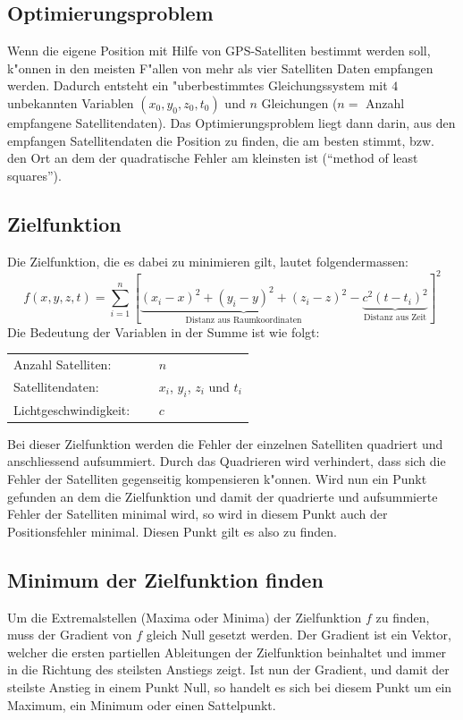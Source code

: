 \begin{refsection}
\section{Optimierungsproblem}
Wenn die eigene Position mit Hilfe von GPS-Satelliten bestimmt werden
soll, k"onnen in den meisten F"allen von mehr als vier Satelliten Daten
empfangen werden. Dadurch entsteht ein "uberbestimmtes Gleichungssystem
mit $4$ unbekannten Variablen $(x_0,y_0,z_0,t_0)$ und $n$ Gleichungen
($n = $ Anzahl empfangene Satellitendaten). Das Optimierungsproblem liegt
dann darin, aus den empfangen Satellitendaten die Position zu finden,
die am besten stimmt, bzw. den Ort an dem der quadratische Fehler am
kleinsten ist (``method of least squares'').

\subsection{Zielfunktion}
Die Zielfunktion, die es dabei zu minimieren gilt, lautet folgendermassen:
\[
f(x,y,z,t)
=
\sum_{i=1}^{n}\left[
\underbrace{(x_i-x)^2 + (y_i-y)^2 + (z_i-z)^2}_{\text{Distanz aus Raumkoordinaten}}
-
\underbrace{c^2 (t-t_i)^2}_{\text{Distanz aus Zeit}}\right]^2
\]
Die Bedeutung der Variablen in der Summe ist wie folgt:
\begin{center}
\begin{tabular}{ll}
Anzahl Satelliten: $\quad$& $n$\\
Satellitendaten: $\quad$& $x_i$, $y_i$, $z_i$ und $t_i$\\
Lichtgeschwindigkeit: $\quad$& $c$\\
\end{tabular}
\end{center}
Bei dieser Zielfunktion werden die Fehler der einzelnen Satelliten
quadriert und anschliessend aufsummiert. Durch das Quadrieren wird
verhindert, dass sich die Fehler der Satelliten gegenseitig kompensieren
k"onnen. Wird nun ein Punkt gefunden an dem die Zielfunktion und damit
der quadrierte und aufsummierte Fehler der Satelliten minimal wird,
so wird in diesem Punkt auch der Positionsfehler minimal. Diesen Punkt
gilt es also zu finden.

\subsection{Minimum der Zielfunktion finden}\label{Minimum der ZF}
Um die Extremalstellen (Maxima oder Minima) der Zielfunktion $f$
zu finden, muss der Gradient von $f$ gleich Null gesetzt werden. Der
Gradient ist ein Vektor, welcher die ersten partiellen Ableitungen
der Zielfunktion beinhaltet und immer in die Richtung des steilsten
Anstiegs zeigt. Ist nun der Gradient, und damit der steilste Anstieg in
einem Punkt Null, so handelt es sich bei diesem Punkt um ein Maximum,
ein Minimum oder einen Sattelpunkt.


\end{refsection}
